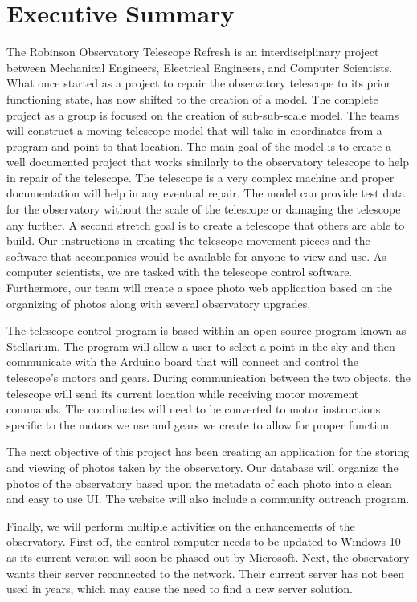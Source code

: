 \documentclass[12pt]{article}
\begin{document}
\newpage

\section{Executive Summary}

The Robinson Observatory Telescope Refresh is an interdisciplinary project between Mechanical Engineers, Electrical Engineers, and Computer Scientists. What once started as a project to repair the observatory telescope to its prior functioning state, has now shifted to the creation of a model. The complete project as a group is focused on the creation of sub-sub-scale model. The teams will construct a moving telescope model that will take in coordinates from a program and point to that location. The main goal of the model is to create a well documented project that works similarly to the observatory telescope to help in repair of the telescope. The telescope is a very complex machine and proper documentation will help in any eventual repair. The model can provide test data for the observatory without the scale of the telescope or damaging the telescope any further. A second stretch goal is to create a telescope that others are able to build. Our instructions in creating the telescope movement pieces and the software that accompanies would be available for anyone to view and use. As computer scientists, we are tasked with the telescope control software. Furthermore, our team will create a space photo web application based on the organizing of photos along with several observatory upgrades.

The telescope control program is based within an open-source program known as Stellarium. The program will allow a user to select a point in the sky and then communicate with the Arduino board that will connect and control the telescope’s motors and gears. During communication between the two objects, the telescope will send its current location while receiving motor movement commands. The coordinates will need to be converted to motor instructions specific to the motors we use and gears we create to allow for proper function.

The next objective of this project has been creating an application for the storing and viewing of photos taken by the observatory. Our database will organize the photos of the observatory based upon the metadata of each photo into a clean and easy to use UI. The website will also include a community outreach program.

Finally, we will perform multiple activities on the enhancements of the observatory. First off, the control computer needs to be updated to Windows 10 as its current version will soon be phased out by Microsoft. Next, the observatory wants their server reconnected to the network. Their current server has not been used in years, which may cause the need to find a new server solution. 
\end{document}
